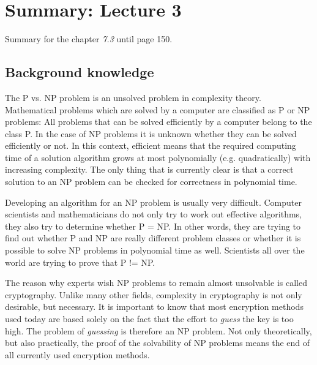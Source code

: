 \documentclass[a4]{scrartcl}
\begin{document}




\section*{Summary: Lecture 3}

Summary for the chapter \textit{7.3} until page 150. \cite{CC, book}




\subsection*{Background knowledge}

The P vs. NP problem is an unsolved problem in complexity theory.
Mathematical problems which are solved by a computer are classified as P or NP problems: All problems that can be solved efficiently by a computer belong to the class P. In the case of NP problems it is unknown whether they can be solved efficiently or not. In this context, efficient means that the required computing time of a solution algorithm grows at most polynomially (e.g. quadratically) with increasing complexity. The only thing that is currently clear is that a correct solution to an NP problem can be checked for correctness in polynomial time. 

Developing an algorithm for an NP problem is usually very difficult. Computer scientists and mathematicians do not only try to work out effective algorithms, they also try to determine whether P = NP. In other words, they are trying to find out whether P and NP are really different problem classes or whether it is possible to solve NP problems in polynomial time as well. Scientists all over the world are trying to prove that P != NP. 

The reason why experts wish NP problems to remain almost unsolvable is called cryptography. Unlike many other fields, complexity in cryptography is not only desirable, but necessary. It is important to know that most encryption methods used today are based solely on the fact that the effort to \textit{guess} the key is too high. The problem of \textit{guessing} is therefore an NP problem. Not only theoretically, but also practically, the proof of the solvability of NP problems means the end of all currently used encryption methods.
\end{document}

